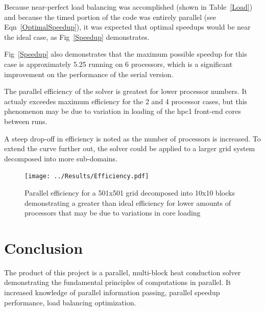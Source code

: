 \documentclass[twocolumn,10pt]{asme2ej}
\begin{document}
Because near-perfect load balancing was accomplished (shown in Table~\ref{Load}) and because the timed portion of the code was entirely parallel (see Eqn~\ref{OptimalSpeedup}), it was expected that optimal speedups would be near the ideal case, as Fig~\ref{Speedup} demonstrates.





Fig~\ref{Speedup} also demonstrates that the maximum possible speedup for this case is approximately 5.25 running on 6 processors, which is a significant improvement on the performance of the serial version.



The parallel efficiency of the solver is greatest for lower processor numbers.  It actualy exceedes maximum efficiency for the 2 and 4 processor cases, but this phenomenon may be due to variation in loading of the hpc1 front-end cores between runs.



A steep drop-off in efficiency is noted as the number of processors is increased.  To extend the curve further out, the solver could be applied to a larger grid system decomposed into more sub-domains.

\begin{figure}[htb]
\begin{center}
\texttt{[image: ../Results/Efficiency.pdf]}
\caption{Parallel efficiency for a 501x501 grid decomposed into 10x10 blocks demonstrating a greater than ideal efficiency for lower amounts of processors that may be due to variations in core loading}
\label{Effish}
\end{center}
\end{figure}




\section{Conclusion}

The product of this project is a parallel, multi-block heat conduction solver demonstrating the fundamental principles of computations in parallel.  It increased knowledge of parallel information passing, parallel speedup performance, load balancing optimization.
\end{document}
